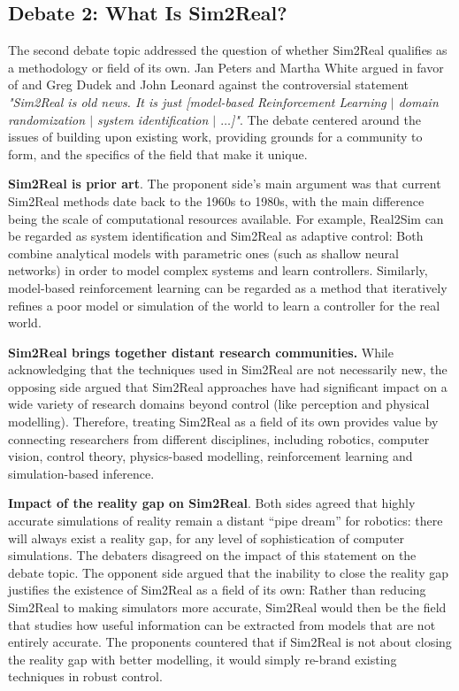 \subsection{Debate 2: What Is Sim2Real?}

The second debate topic addressed the question of whether Sim2Real qualifies as a methodology or field of its own. Jan Peters and Martha White argued in favor of and Greg Dudek and John Leonard against the controversial statement \emph{"Sim2Real is old news. It is just [model-based Reinforcement Learning $\vert$ domain randomization $\vert$ system identification $\vert$ $\ldots$]"}.
The debate centered around the issues of building upon existing work, providing grounds for a community to form, and the specifics of the field that make it unique.

\textbf{Sim2Real is prior art}. The proponent side's main argument was that current Sim2Real methods date back to the 1960s to 1980s, with the main difference being the scale of computational resources available. 
For example, Real2Sim can be regarded as system identification and Sim2Real as adaptive control: Both combine analytical models with parametric ones (such as shallow neural networks) in order to model complex systems and learn controllers. Similarly, model-based reinforcement learning can be regarded as a method that iteratively refines a poor model or simulation of the world to learn a controller for the real world. 

\textbf{Sim2Real brings together distant research communities.} While acknowledging that the techniques used in Sim2Real are not necessarily new, the opposing side argued that Sim2Real approaches have had significant impact on a wide variety of research domains beyond control (like perception and physical modelling). Therefore, treating Sim2Real as a field of its own provides value by connecting researchers from different disciplines, including robotics, computer vision, control theory, physics-based modelling, reinforcement learning and simulation-based inference. 



\textbf{Impact of the reality gap on Sim2Real}. Both sides agreed that highly accurate simulations of reality remain a distant “pipe dream” for robotics: there will always exist a reality gap, for any level of sophistication of computer simulations. The debaters disagreed on the impact of this statement on the debate topic. The opponent side argued that the inability to close the reality gap justifies the existence of Sim2Real as a field of its own: Rather than reducing Sim2Real to making simulators more accurate, Sim2Real would then be the field that studies how useful information can be extracted from models that are not entirely accurate. The proponents countered that if Sim2Real is not about closing the reality gap with better modelling, it would simply re-brand existing techniques in robust control.

